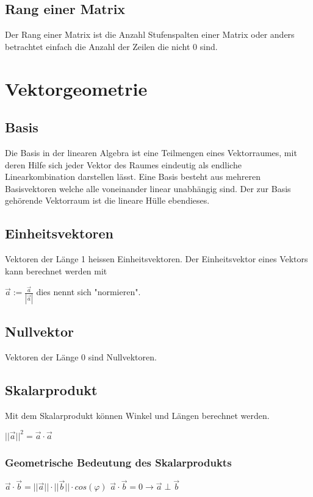 \documentclass[11pt,a4paper,onecolumn]{scrartcl}
\begin{document}
\begin{flushleft}
\subsection{Rang einer Matrix}
Der Rang einer Matrix ist die Anzahl Stufenspalten einer Matrix oder anders betrachtet einfach die Anzahl der Zeilen die nicht 0 sind.


\section{Vektorgeometrie}

\subsection{Basis}
Die Basis in der linearen Algebra ist eine Teilmengen eines Vektorraumes, mit deren Hilfe sich jeder Vektor des Raumes eindeutig als endliche Linearkombination darstellen lässt. Eine Basis besteht aus mehreren Basisvektoren welche alle voneinander linear unabhängig sind.
Der zur Basis gehörende Vektorraum ist die lineare Hülle ebendieses.

\subsection{Einheitsvektoren}
Vektoren der Länge 1 heissen Einheitsvektoren.\linebreak
Der Einheitsvektor eines Vektors kann berechnet werden mit \linebreak

$\vec{a} := \frac{\vec{a}}{|\vec{a}|}$ dies nennt sich "normieren".

\subsection{Nullvektor}
Vektoren der Länge 0 sind Nullvektoren.

\subsection{Skalarprodukt}
Mit dem Skalarprodukt können Winkel und Längen berechnet werden.

$ ||\vec{a}||^{2} = \vec{a}\cdot\vec{a}$

\subsubsection{Geometrische Bedeutung des Skalarprodukts}
$ \vec{a} \cdot \vec{b} = ||\vec{a}|| \cdot ||\vec{b} || \cdot cos(\varphi)$\linebreak
$ \vec{a} \cdot \vec{b} = 0 \rightarrow \vec{a} \perp \vec{b}$\linebreak



\end{flushleft}
\end{document}
